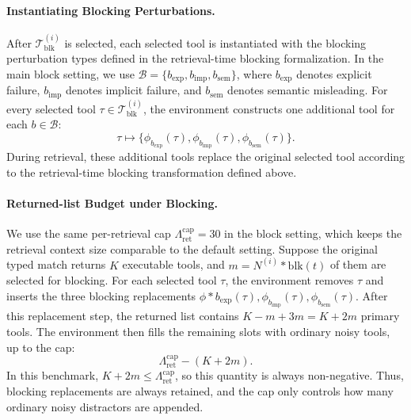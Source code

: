 \paragraph{Instantiating Blocking Perturbations.}
After $\mathcal{T}^{(i)}_{\mathrm{blk}}$ is selected, each selected tool is instantiated with the blocking perturbation types defined in the retrieval-time blocking formalization.
In the main block setting, we use $\mathcal{B}=\{b_{\mathrm{exp}}, b_{\mathrm{imp}}, b_{\mathrm{sem}}\}$, where $b_{\mathrm{exp}}$ denotes explicit failure, $b_{\mathrm{imp}}$ denotes implicit failure, and $b_{\mathrm{sem}}$ denotes semantic misleading.
For every selected tool $\tau \in \mathcal{T}^{(i)}_{\mathrm{blk}}$, the environment constructs one additional tool for each $b\in\mathcal{B}$:
\begin{equation}
\tau
\mapsto
\{\phi_{b_{\mathrm{exp}}}(\tau),
\phi_{b_{\mathrm{imp}}}(\tau),
\phi_{b_{\mathrm{sem}}}(\tau)\}.
\end{equation}
During retrieval, these additional tools replace the original selected tool according to the retrieval-time blocking transformation defined above.

\paragraph{Returned-list Budget under Blocking.}
We use the same per-retrieval cap $\Lambda_{\mathrm{ret}}^{\mathrm{cap}}=30$ in the block setting, which keeps the retrieval context size comparable to the default setting.
Suppose the original typed match returns $K$ executable tools, and $m=N^{(i)}*{\mathrm{blk}}(t)$ of them are selected for blocking.
For each selected tool $\tau$, the environment removes $\tau$ and inserts the three blocking replacements ${\phi*{b_{\mathrm{exp}}}(\tau), \phi_{b_{\mathrm{imp}}}(\tau), \phi_{b_{\mathrm{sem}}}(\tau)}$.
After this replacement step, the returned list contains $K-m+3m=K+2m$ primary tools.
The environment then fills the remaining slots with ordinary noisy tools, up to the cap:
\begin{equation}
\Lambda_{\mathrm{ret}}^{\mathrm{cap}} - (K+2m).
\end{equation}
In this benchmark, $K+2m \leq \Lambda_{\mathrm{ret}}^{\mathrm{cap}}$, so this quantity is always non-negative.
Thus, blocking replacements are always retained, and the cap only controls how many ordinary noisy distractors are appended.

